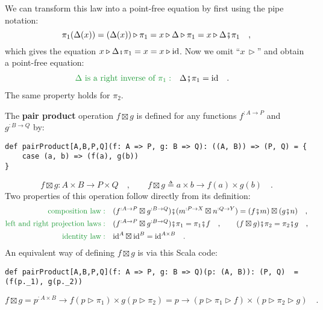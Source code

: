 We can transform this law into a point-free equation by first using
the pipe notation:
\[
\pi_{1}(\Delta(x))=(\Delta(x))\triangleright\pi_{1}=x\triangleright\Delta\triangleright\pi_{1}=x\triangleright\Delta\bef\pi_{1}\quad,
\]
which gives the equation $x\triangleright\Delta\bef\pi_{1}=x=x\triangleright\text{id}$.
Now we omit \textsf{``}$x\,\triangleright$\textsf{''} and obtain a point-free equation:
\begin{align}
{\color{greenunder}\Delta\text{ is a right inverse of }\pi_{1}:}\quad & \Delta\bef\pi_{1}=\text{id}\quad.\label{eq:pair-identity-law-left}
\end{align}
The same property holds for $\pi_{2}$.

The \textbf{pair product}
operation $f\boxtimes g$ is defined for any functions $f^{:A\rightarrow P}$
and $g^{:B\rightarrow Q}$ by:
\begin{lstlisting}
def pairProduct[A,B,P,Q](f: A => P, g: B => Q): ((A, B)) => (P, Q) = {
    case (a, b) => (f(a), g(b))
}
\end{lstlisting}
\[
f\boxtimes g:A\times B\rightarrow P\times Q\quad,\quad\quad f\boxtimes g\triangleq a\times b\rightarrow f(a)\times g(b)\quad.
\]
Two properties of this operation follow directly from its definition:
\begin{align}
{\color{greenunder}\text{composition law}:}\quad & (f^{:A\rightarrow P}\boxtimes g^{:B\rightarrow Q})\bef(m^{:P\rightarrow X}\boxtimes n^{:Q\rightarrow Y})=(f\bef m)\boxtimes(g\bef n)\quad,\label{eq:pair-product-composition-law}\\
{\color{greenunder}\text{left and right projection laws}:}\quad & (f^{:A\rightarrow P}\boxtimes g^{:B\rightarrow Q})\bef\pi_{1}=\pi_{1}\bef f\quad,\quad\quad(f\boxtimes g)\bef\pi_{2}=\pi_{2}\bef g\quad,\label{eq:pair-product-projection-laws}\\
{\color{greenunder}\text{identity law}:}\quad & \text{id}^{A}\boxtimes\text{id}^{B}=\text{id}^{A\times B}\quad.\nonumber 
\end{align}
An equivalent way of defining $f\boxtimes g$ is via this Scala code:
\begin{lstlisting}
def pairProduct[A,B,P,Q](f: A => P, g: B => Q)(p: (A, B)): (P, Q)  =  (f(p._1), g(p._2))
\end{lstlisting}
\[
f\boxtimes g=p^{:A\times B}\rightarrow f(p\triangleright\pi_{1})\times g(p\triangleright\pi_{2})=p\rightarrow(p\triangleright\pi_{1}\triangleright f)\times(p\triangleright\pi_{2}\triangleright g)\quad.
\]

